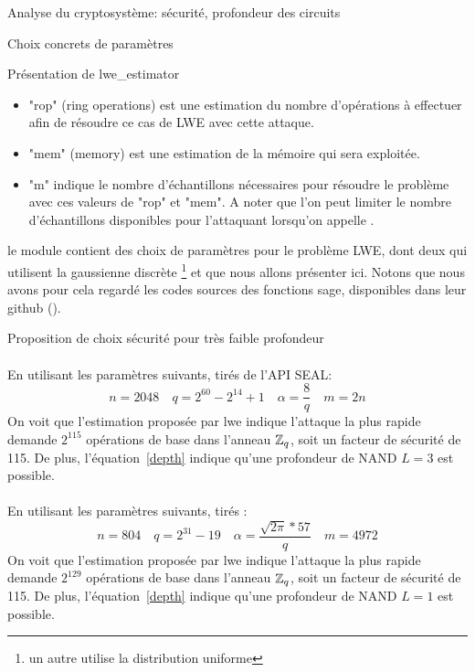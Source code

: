 \begin{section}{Analyse du cryptosystème: sécurité, profondeur des circuits}
\begin{subsection}{Choix concrets de paramètres}
\begin{subsubsection}{Présentation de lwe\_estimator}
	\begin{itemize}
	\item "rop" (ring operations) est une estimation du nombre d'opérations à effectuer afin de résoudre
	ce cas de LWE avec cette attaque.
	
	\item "mem" (memory) est une estimation de la mémoire qui sera exploitée.
	
	\item "m" indique le nombre d'échantillons nécessaires pour résoudre le problème avec ces valeurs de
	"rop" et "mem". A noter que l'on peut limiter le nombre d'échantillons disponibles pour l'attaquant
	lorsqu'on appelle .
	\end{itemize}

	le module  contient des choix de paramètres pour
	le problème LWE, dont deux qui utilisent la gaussienne discrète
	\footnote{un autre utilise la distribution uniforme}
	et que nous allons présenter ici. Notons que nous avons pour cela 
	regardé les codes 
	sources des fonctions sage, disponibles dans leur github (\cite{sage}).
	\end{subsubsection}

	\begin{subsubsection}{Proposition de choix sécurité pour très faible profondeur}
	\paragraph{}
	En utilisant les paramètres suivants, tirés de l'API SEAL:
	\[n = 2048\quad q = 2^{60} - 2^{14} + 1 \quad \alpha = \frac{8}{q}\quad m = 2n \]
	On voit que l'estimation proposée par lwe indique  l'attaque la plus rapide demande 
	$2^115$ opérations de base dans l'anneau $\mathbb{Z}_q$, soit un facteur de sécurité de
	115. De plus, l'équation~\eqref{depth} indique qu'une
	profondeur de NAND $L=3$ est possible.

	\paragraph{}
	En utilisant les paramètres suivants, tirés \cite{cryptoeprint:2015:755}:
	\[n = 804\quad  q = 2^{31} - 19\quad \alpha = \frac{\sqrt{2\pi}*57}{q} \quad m = 4972\]
	On voit que l'estimation proposée par lwe indique  l'attaque la plus rapide demande 
	$2^129$ opérations de base dans l'anneau $\mathbb{Z}_q$, soit un facteur de sécurité de
	115. De plus, l'équation~\eqref{depth} indique qu'une
	profondeur de NAND $L=1$ est possible.
	\end{subsubsection}

	\end{subsection}
\end{section}
